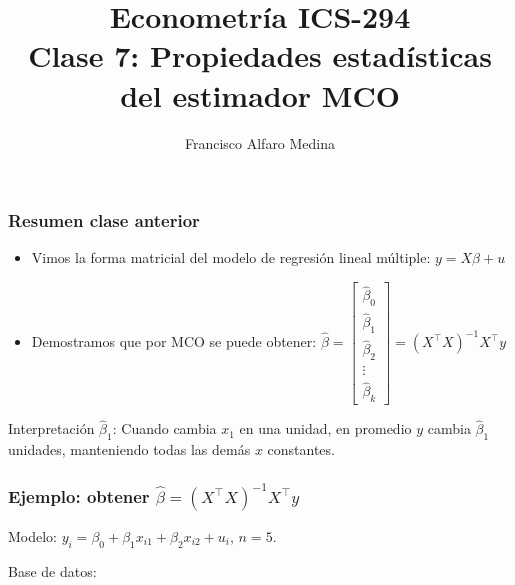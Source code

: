 \documentclass{beamer}
\title[ICS-162]{Econometría ICS-294\\ \small{Clase 7: Propiedades estadísticas del estimador MCO}}
\author{Francisco Alfaro Medina}
\institute[USM]
{Universidad Técnica Federico Santa María\\ %
	\medskip
	\textit{} %
	
}
\date{}
\begin{document}
	
\begin{frame}
	\titlepage %


\end{frame}
\logo{}

\begin{frame}[shrink=10]

\frametitle{Resumen clase anterior}

\begin{itemize}
    \item Vimos la forma matricial del modelo de regresión lineal múltiple: $y = X\beta + u$
    \item Demostramos que por MCO se puede obtener: $\hat{\beta} = \begin{bmatrix} \hat{\beta}_0 \\ \hat{\beta}_1 \\ \hat{\beta}_2 \\ \vdots \\ \hat{\beta}_k \end{bmatrix} = (X^\top X)^{-1}X^\top y$
\end{itemize}

Interpretación $\hat{\beta}_1$: Cuando cambia $x_1$ en una unidad, en promedio $y$ cambia $\hat{\beta}_1$ unidades, manteniendo todas las demás $x$ constantes.

\end{frame}
\begin{frame}[shrink=10]
\frametitle{Ejemplo: obtener $\hat{\beta} = (X^\top X)^{-1}X^\top y$}

Modelo: $y_i = \beta_0 + \beta_1 x_{i1} + \beta_2 x_{i2} + u_i$, $n=5$.

Base de datos: \begin{center}
\end{center}

\end{frame}
\end{document}
